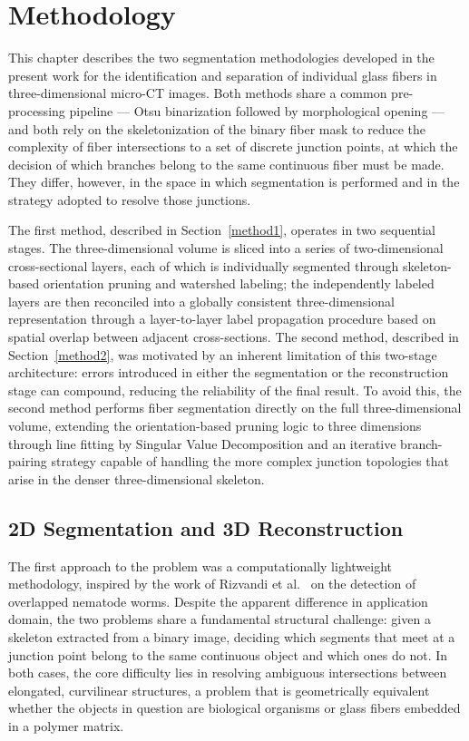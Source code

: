 \chapter{Methodology}

This chapter describes the two segmentation methodologies developed in the present work for the identification and separation of individual glass fibers in three-dimensional micro-CT images. Both methods share a common pre-processing pipeline --- Otsu binarization followed by morphological opening --- and both rely on the skeletonization of the binary fiber mask to reduce the complexity of fiber intersections to a set of discrete junction points, at which the decision of which branches belong to the same continuous fiber must be made. They differ, however, in the space in which segmentation is performed and in the strategy adopted to resolve those junctions.

The first method, described in Section~\ref{method1}, operates in two sequential stages. The three-dimensional volume is sliced into a series of two-dimensional cross-sectional layers, each of which is individually segmented through skeleton-based orientation pruning and watershed labeling; the independently labeled layers are then reconciled into a globally consistent three-dimensional representation through a layer-to-layer label propagation procedure based on spatial overlap between adjacent cross-sections. The second method, described in Section~\ref{method2}, was motivated by an inherent limitation of this two-stage architecture: errors introduced in either the segmentation or the reconstruction stage can compound, reducing the reliability of the final result. To avoid this, the second method performs fiber segmentation directly on the full three-dimensional volume, extending the orientation-based pruning logic to three dimensions through line fitting by Singular Value Decomposition and an iterative branch-pairing strategy capable of handling the more complex junction topologies that arise in the denser three-dimensional skeleton.

\section{2D Segmentation and 3D Reconstruction}
\label{method1}

The first approach to the problem was a computationally lightweight methodology, inspired by the work of Rizvandi et al.\ \cite{rizvandi} on the detection of overlapped nematode worms. Despite the apparent difference in application domain, the two problems share a fundamental structural challenge: given a skeleton extracted from a binary image, deciding which segments that meet at a junction point belong to the same continuous object and which ones do not. In both cases, the core difficulty lies in resolving ambiguous intersections between elongated, curvilinear structures, a problem that is geometrically equivalent whether the objects in question are biological organisms or glass fibers embedded in a polymer matrix. 

